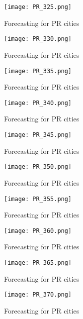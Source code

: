 \begin{figure}[!ht] 
 \centering 
 \texttt{[image: PR\_325.png]} 
 \caption{Forecasting for PR cities } 
 \label{fig:PR_325} 
 \end{figure} 
 
 \begin{figure}[!ht] 
 \centering 
 \texttt{[image: PR\_330.png]} 
 \caption{Forecasting for PR cities } 
 \label{fig:PR_330} 
 \end{figure} 
 
 \begin{figure}[!ht] 
 \centering 
 \texttt{[image: PR\_335.png]} 
 \caption{Forecasting for PR cities } 
 \label{fig:PR_335} 
 \end{figure} 
 
 \begin{figure}[!ht] 
 \centering 
 \texttt{[image: PR\_340.png]} 
 \caption{Forecasting for PR cities } 
 \label{fig:PR_340} 
 \end{figure} 
 
 \begin{figure}[!ht] 
 \centering 
 \texttt{[image: PR\_345.png]} 
 \caption{Forecasting for PR cities } 
 \label{fig:PR_345} 
 \end{figure} 
 
 \begin{figure}[!ht] 
 \centering 
 \texttt{[image: PR\_350.png]} 
 \caption{Forecasting for PR cities } 
 \label{fig:PR_350} 
 \end{figure} 
 
 \begin{figure}[!ht] 
 \centering 
 \texttt{[image: PR\_355.png]} 
 \caption{Forecasting for PR cities } 
 \label{fig:PR_355} 
 \end{figure} 
 
 \begin{figure}[!ht] 
 \centering 
 \texttt{[image: PR\_360.png]} 
 \caption{Forecasting for PR cities } 
 \label{fig:PR_360} 
 \end{figure} 
 
 \begin{figure}[!ht] 
 \centering 
 \texttt{[image: PR\_365.png]} 
 \caption{Forecasting for PR cities } 
 \label{fig:PR_365} 
 \end{figure} 
 
 \begin{figure}[!ht] 
 \centering 
 \texttt{[image: PR\_370.png]} 
 \caption{Forecasting for PR cities } 
 \label{fig:PR_370} 
 \end{figure} 
 
